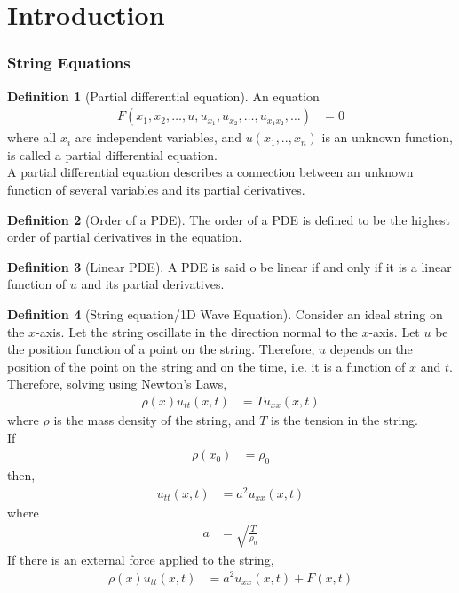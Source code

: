 \documentclass[titlepage, fleqn, a4paper, 12pt, twoside]{article}
\theoremstyle{definition}
\newtheorem{definition}{Definition}
\theoremstyle{theorem}
\begin{document}
\clearpage
{}

\part{Introduction}

\section{String Equations}

\begin{definition}[Partial differential equation]
	An equation
	\begin{align*}
		F(x_1,x_2,\dots,u,u_{x_1},u_{x_2},\dots,u_{x_1 x_2},\dots) & = 0
	\end{align*}
	where all $x_i$ are independent variables, and $u(x_1,..,x_n)$ is an unknown function, is called a partial differential equation.\\
	A partial differential equation describes a connection between an unknown function of several variables and its partial derivatives.
\end{definition}

\begin{definition}[Order of a PDE]
	The order of a PDE is defined to be the highest order of partial derivatives in the equation.
\end{definition}

\begin{definition}[Linear PDE]
	A PDE is said o be linear if and only if it is a linear function of $u$ and its partial derivatives.
\end{definition}

\begin{definition}[String equation/1D Wave Equation]
	Consider an ideal string on the $x$-axis.
	Let the string oscillate in the direction normal to the $x$-axis.
	Let $u$ be the position function of a point on the string.
	Therefore, $u$ depends on the position of the point on the string and on the time, i.e. it is a function of $x$ and $t$.\\
	Therefore, solving using Newton's Laws,
	\begin{align*}
		\rho(x) u_{t t}(x,t) & = T u_{x x}(x,t)
	\end{align*}
	where $\rho$ is the mass density of the string, and $T$ is the tension in the string.\\
	If
	\begin{align*}
		\rho(x_0) & = \rho_0
	\end{align*}
	then,
	\begin{align*}
		u_{t t}(x,t) & = a^2 u_{x x}(x,t)
	\end{align*}
	where
	\begin{align*}
		a & = \sqrt{\frac{T}{\rho_0}}
	\end{align*}
	If there is an external force applied to the string,
	\begin{align*}
		\rho(x) u_{t t}(x,t) & = a^2 u_{x x}(x,t) + F(x,t)
	\end{align*}
\end{definition}
\end{document}
